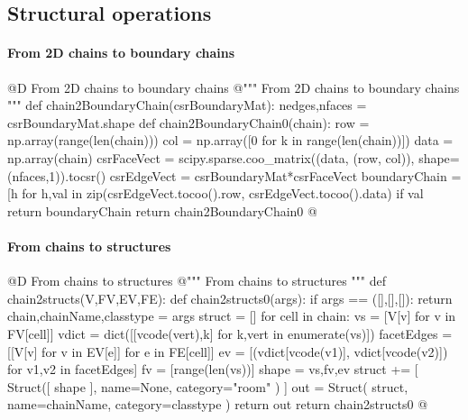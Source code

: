 \documentclass[11pt,oneside]{article}    %
\begin{document}
\subsection{Structural operations}

\paragraph{From 2D chains to boundary chains}
@D From 2D chains to boundary chains
@{""" From 2D chains to boundary chains """
def chain2BoundaryChain(csrBoundaryMat):
	nedges,nfaces = csrBoundaryMat.shape
	def chain2BoundaryChain0(chain):
		row = np.array(range(len(chain)))
		col = np.array([0 for k in range(len(chain))])
		data = np.array(chain)
		csrFaceVect = scipy.sparse.coo_matrix((data, (row, col)), shape=(nfaces,1)).tocsr()
		csrEdgeVect = csrBoundaryMat*csrFaceVect
		boundaryChain = [h for h,val in
			zip(csrEdgeVect.tocoo().row, csrEdgeVect.tocoo().data) if val%
		return boundaryChain
	return chain2BoundaryChain0
@}

\paragraph{From chains to structures}
@D From chains to structures
@{""" From chains to structures """
def chain2structs(V,FV,EV,FE):
    def chain2structs0(args): 
        if args == ([],[],[]): return
        chain,chainName,classtype = args
        struct = []
        for cell in chain:
            vs = [V[v] for v in FV[cell]]
            vdict = dict([[vcode(vert),k] for k,vert in enumerate(vs)])
            facetEdges = [[V[v] for v in EV[e]] for e in FE[cell]]
            ev = [(vdict[vcode(v1)], vdict[vcode(v2)]) for v1,v2 in facetEdges]
            fv = [range(len(vs))]
            shape = vs,fv,ev
            struct += [ Struct([ shape ], name=None, category="room" ) ]
        out = Struct( struct, name=chainName, category=classtype )
        return out
    return chain2structs0
@}
\end{document}
